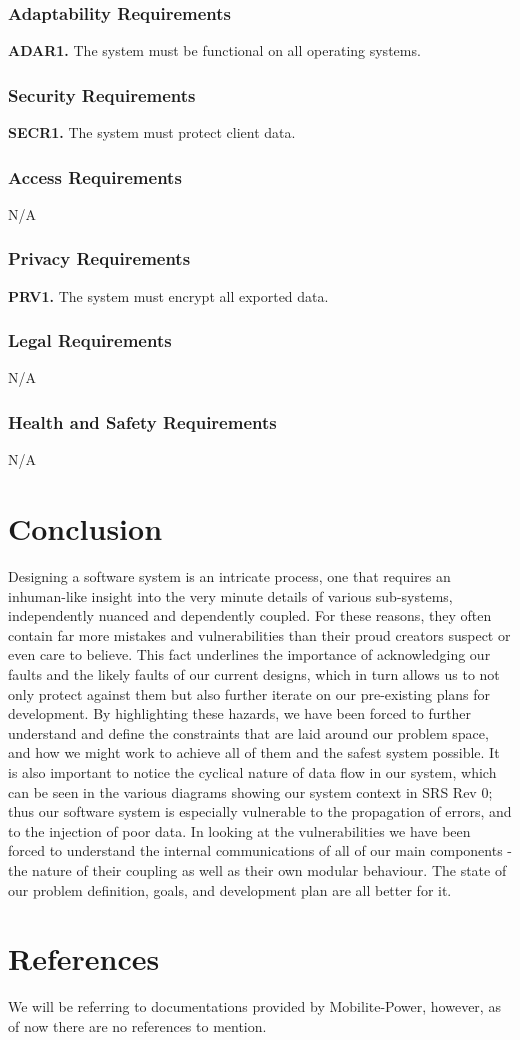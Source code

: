 \documentclass[12pt, titlepage]{article}
\begin{document}
\subsubsection{Adaptability Requirements}
\textbf{ADAR1.} The system must be functional on all operating systems.

\subsubsection{Security Requirements}
\textbf{SECR1.} The system must protect client data.

\subsubsection{Access Requirements}
N/A

\subsubsection{Privacy Requirements}
\textbf{PRV1.} The system must encrypt all exported data.


\subsubsection{Legal Requirements}
N/A

\subsubsection{Health and Safety Requirements}
N/A

\section{Conclusion}
Designing a software system is an intricate process, one that requires an inhuman-like insight into the very minute details of various sub-systems, independently nuanced and dependently coupled. For these reasons, they often contain far more mistakes and vulnerabilities than their proud creators suspect or even care to believe. This fact underlines the importance of acknowledging our faults and the likely faults of our current designs, which in turn allows us to not only protect against them but also further iterate on our pre-existing plans for development. By highlighting these hazards, we have been forced to further understand and define the constraints that are laid around our problem space, and how we might work to achieve all of them and the safest system possible. It is also important to notice the cyclical nature of data flow in our system, which can be seen in the various diagrams showing our system context in SRS Rev 0; thus our software system is especially vulnerable to the propagation of errors, and to the injection of poor data. In looking at the vulnerabilities we have been forced to understand the internal communications of all of our main components - the nature of their coupling as well as their own modular behaviour. The state of our problem definition, goals, and development plan are all better for it.

\section*{References}
We will be referring to documentations provided by Mobilite-Power, however, as of now there are no references to mention.
\end{document}
